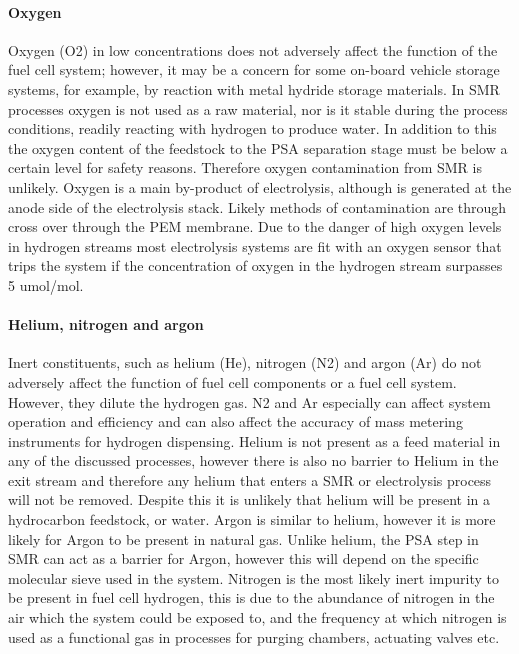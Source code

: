 \paragraph{Oxygen}
Oxygen (O2) in low concentrations does not adversely affect the function of the fuel cell system; however, it may be a concern for some on-board vehicle storage systems, for example, by reaction with metal hydride storage materials.
In SMR processes oxygen is not used as a raw material, nor is it stable during the process conditions, readily reacting with hydrogen to produce water. In addition to this the oxygen content of the feedstock to the PSA separation stage must be below a certain level for safety reasons. Therefore oxygen contamination from SMR is unlikely. 
Oxygen is a main by-product of electrolysis, although is generated at the anode side of the electrolysis stack. Likely methods of contamination are through cross over through the PEM membrane. Due to the danger of high oxygen levels in hydrogen streams most electrolysis systems are fit with an oxygen sensor that trips the system if the concentration of oxygen in the hydrogen stream surpasses 5 umol/mol. 

\paragraph{Helium, nitrogen and argon}
Inert constituents, such as helium (He), nitrogen (N2) and argon (Ar) do not adversely affect the function of fuel cell components or a fuel cell system. However, they dilute the hydrogen gas. N2 and Ar especially can affect system operation and efficiency and can also affect the accuracy of mass metering instruments for hydrogen dispensing.
Helium is not present as a feed material in any of the discussed processes, however there is also no barrier to Helium in the exit stream and therefore any helium that enters a SMR or electrolysis process will not be removed. Despite this it is unlikely that helium will be present in a hydrocarbon feedstock, or water.
Argon is similar to helium, however it is more likely for Argon to be present in natural gas. Unlike helium, the PSA step in SMR can act as a barrier for Argon, however this will depend on the specific molecular sieve used in the system.
Nitrogen is the most likely inert impurity to be present in fuel cell hydrogen, this is due to the abundance of nitrogen in the air which the system could be exposed to, and the frequency at which nitrogen is used as a functional gas in processes for purging chambers, actuating valves etc.

